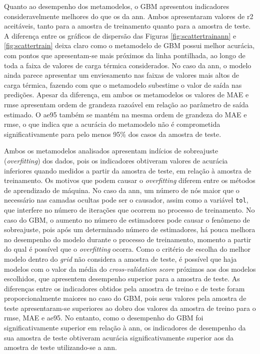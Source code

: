 \documentclass{article}
\begin{document}
Quanto ao desempenho dos metamodelos, o GBM apresentou indicadores consideravelmente melhores do que os da \acrshort{ann}.
Ambos apresentaram valores de \acrshort{r2} aceitáveis, tanto para a amostra de treinamento quanto para a amostra de teste.
A diferença entre os gráficos de dispersão das Figuras \ref{fig:scattertrainann} e \ref{fig:scattertrain} deixa claro como o metamodelo de GBM possui melhor acurácia, com pontos que apresentam-se mais próximos da linha pontilhada, ao longo de toda a faixa de valores de carga térmica considerados.
No caso da \acrshort{ann}, o modelo ainda parece apresentar um enviesamento nas faixas de valores mais altos de carga térmica, fazendo com que o metamodelo subestime o valor de saída nas predições.
Apesar da diferença, em ambos os metamodelos os valores de MAE e \acrshort{rmse} apresentam ordem de grandeza razoável em relação ao parâmetro de saída estimado.
O \acrshort{ae95} também se mantém na mesma ordem de grandeza do MAE e \acrshort{rmse}, o que indica que a acurácia do metamodelo não é comprometida significativamente para pelo menos 95\% dos casos da amostra de teste.

Ambos os metamodelos analisados apresentam indícios de sobreajuste (\textit{overfitting}) dos dados, pois os indicadores obtiveram valores de acurácia inferiores quando medidos a partir da amostra de teste, em relação à amostra de treinamento.
Os motivos que podem causar o \textit{overfitting} diferem entre os métodos de aprendizado de máquina.
No caso da \acrshort{ann}, um número de nós maior que o necessário nas camadas ocultas pode ser o causador, assim como a variável \texttt{tol}, que interfere no número de iterações que ocorrem no processo de treinamento.
No caso do GBM, o aumento no número de estimadores pode causar o fenômeno de sobreajuste, pois após um determinado número de estimadores, há pouca melhora no desempenho do modelo durante o processo de treinamento, momento a partir do qual é possível que o \textit{overfitting} ocorra.
Como o critério de escolha do melhor modelo dentro do \textit{grid} não considera a amostra de teste, é possível que haja modelos com o valor da média do \textit{cross-validation score} próximos aos dos modelos escolhidos, que apresentem desempenho superior para a amostra de teste.
As diferenças entre os indicadores obtidos pela amostra de treino e de teste foram proporcionalmente maiores no caso do GBM, pois seus valores pela amostra de teste apresentaram-se superiores ao dobro dos valores da amostra de treino para o \acrshort{rmse}, MAE e \acrshort{ae95}.
No entanto, como o desempenho do GBM foi significativamente superior em relação à \acrshort{ann}, os indicadores de desempenho da sua amostra de teste obtiveram acurácia significativamente superior aos da amostra de teste utilizando-se a \acrshort{ann}.
\end{document}
